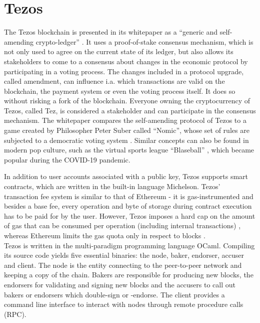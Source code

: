 \section{Tezos}\label{sec:tezos}
The Tezos blockchain is presented in its whitepaper as a \enquote{generic and self-amending crypto-ledger} \cite{goodman_tezos_2014}. It uses a proof-of-stake consensus mechanism, which is not only used to agree on the current state of its ledger, but also allows its stakeholders to come to a consensus about changes in the economic protocol by participating in a voting process. The changes included in a protocol upgrade, called amendment, can influence i.a. which transactions are valid on the blockchain, the payment system or even the voting process itself. It does so without risking a fork of the blockchain. Everyone owning the cryptocurrency of Tezos, called Tez, is considered a stakeholder and can participate in the consensus mechanism. The whitepaper compares the self-amending protocol of Tezos to a game created by Philosopher Peter Suber called ``Nomic'', whose set of rules are subjected to a democratic voting system \cite{nomic}. Similar concepts can also be found in modern pop culture, such as the virtual sports league ``Blaseball'' \cite{blaseball}, which became popular during the COVID-19 pandemic.

In addition to user accounts associated with a public key, Tezos supports smart contracts, which are written in the built-in language Michelson. Tezos' transaction fee system is similar to that of Ethereum \cite{wood_ethereum_2021} - it is gas-instrumented and besides a base fee, every operation and byte of storage during contract execution has to be paid for by the user. However, Tezos imposes a hard cap on the amount of gas that can be consumed per operation (including internal transactions) \cite{tezos_docs}\cite{morley_repo}, whereas Ethereum limits the gas quota only in respect to blocks \cite{wood_ethereum_2021}.\\
Tezos is written in the multi-paradigm programming language OCaml. Compiling its source code yields five essential binaries: the  node, baker, endorser, accuser and client. The node is the entity connecting to the peer-to-peer network and keeping a copy of the chain. Bakers are responsible for producing new blocks, the endorsers for validating and signing new blocks and the accusers to call out bakers or endorsers which double-sign or -endorse. The client provides a command line interface to interact with nodes through remote procedure calls (RPC). 


